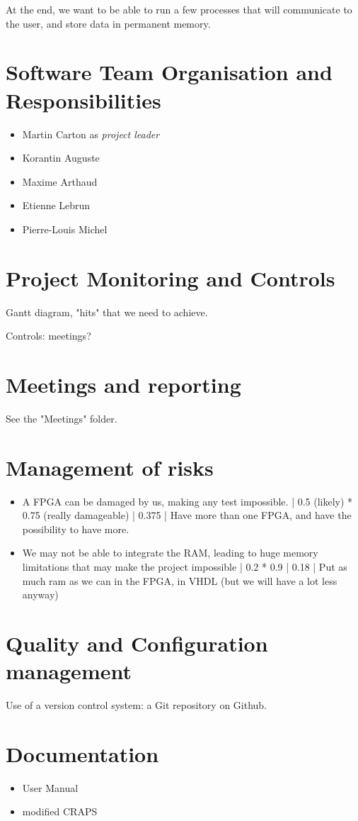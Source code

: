 \documentclass{article}
\begin{document}
    At the end, we want to be able to run a few processes that will communicate
    to the user, and store data in permanent memory.

  \section{Software Team Organisation and Responsibilities}
    \begin{itemize}
      \item Martin Carton as \textit{project leader}
      \item Korantin Auguste
      \item Maxime Arthaud
      \item Etienne Lebrun
      \item Pierre-Louis Michel
    \end{itemize}

  \section{Project Monitoring and Controls}
    Gantt diagram, "hits" that we need to achieve.

    Controls: meetings?

  \section{Meetings and reporting}
    See the "Meetings" folder.

  \section{Management of risks}
    \begin{itemize}
      \item A FPGA can be damaged by us, making any test impossible. | 0.5
        (likely) * 0.75 (really damageable) | 0.375 | Have more than one FPGA,
        and have the possibility to have more.
      \item We may not be able to integrate the RAM, leading to huge memory
        limitations that may make the project impossible | 0.2 * 0.9 | 0.18 |
        Put as much ram as we can in the FPGA, in VHDL (but we will have a lot
        less anyway)
    \end{itemize}

  \section{Quality and Configuration management}
    Use of a version control system: a Git repository on Github.

  \section{Documentation}
    \begin{itemize}
      \item User Manual
      \item modified CRAPS
    \end{itemize}
\end{document}
